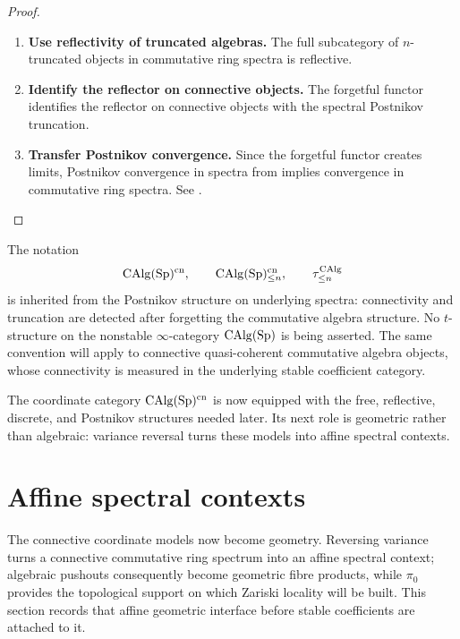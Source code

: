 \begin{proof}
\leavevmode
\begin{enumerate}[label=\textup{(\arabic*)}]
    \item \textbf{Use reflectivity of truncated algebras.}
    The full subcategory of $n$-truncated objects in commutative ring spectra
    is reflective.

    \item \textbf{Identify the reflector on connective objects.}
    The forgetful functor identifies the reflector on
    connective objects with the spectral Postnikov truncation.

    \item \textbf{Transfer Postnikov convergence.}
    Since the
    forgetful functor creates limits, Postnikov convergence in spectra from
     implies convergence in
    commutative ring spectra. See \cite{LurieHigherAlgebra,LurieDAGIV}.
\end{enumerate}
\end{proof}

\begin{remark}
\label{rem:postnikov-not-t-structure-on-algebras}
The notation
\[
    \operatorname{CAlg}(\operatorname{Sp})^{\mathrm{cn}},
    \qquad
    \operatorname{CAlg}(\operatorname{Sp})^{\mathrm{cn}}_{\leq n},
    \qquad
    \tau_{\leq n}^{\operatorname{CAlg}}
\]
is inherited from the Postnikov structure on underlying spectra: connectivity
and truncation are detected after forgetting the commutative algebra
structure. No $t$-structure on the nonstable $\infty$-category
$\operatorname{CAlg}(\operatorname{Sp})$ is being asserted. The same convention will apply to
connective quasi-coherent commutative algebra objects, whose connectivity is
measured in the underlying stable coefficient category.
\end{remark}

The coordinate category \(\operatorname{CAlg}(\operatorname{Sp})^{\mathrm{cn}}\) is now equipped with
the free, reflective, discrete, and Postnikov structures needed later. Its
next role is geometric rather than algebraic: variance reversal turns these
models into affine spectral contexts.

\section{Affine spectral contexts}
\label{sec:affine-spectral-schemes}

The connective coordinate models now become geometry. Reversing variance
turns a connective commutative ring spectrum into an affine spectral context;
algebraic pushouts consequently become geometric fibre products, while
\(\pi_0\) provides the topological support on which Zariski locality will be
built. This section records that affine geometric interface before stable
coefficients are attached to it.

